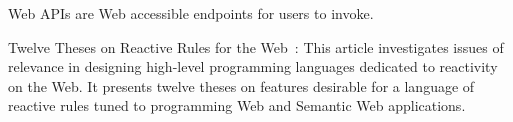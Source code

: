 


Web APIs are Web accessible endpoints for users to invoke.

Twelve Theses on Reactive Rules for the Web~\cite{10.1007-11896548_63}:
This article investigates issues of relevance in designing high-level
programming languages dedicated to reactivity on the Web. It presents
twelve theses on features desirable for a language of reactive rules tuned
to programming Web and Semantic Web applications.



